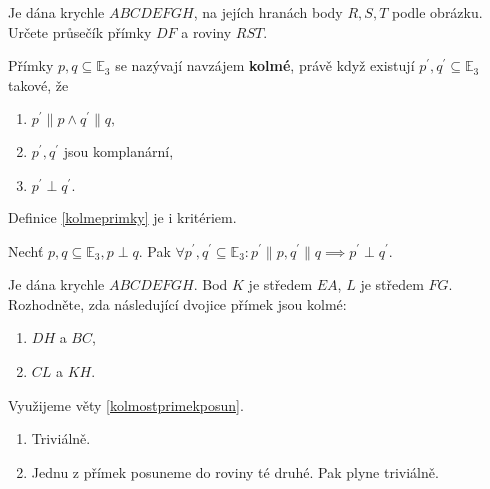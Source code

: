 \begin{priklad}
Je dána krychle $ABCDEFGH$, na jejích hranách body $R,S,T$ podle obrázku. Určete
průsečík přímky $DF$ a roviny $RST$.

\begin{figure}[ht!]
  \centering
\end{figure}
\end{priklad}

\begin{definition}\label{kolmeprimky}
    Přímky $p,q \subseteq \mathbb E_3$ se nazývají navzájem \textbf{kolmé}, právě když
    existují $p^\prime, q^\prime \subseteq \mathbb E_3$ takové, že
    \begin{enumerate}[$i.$]
    \item   $p^\prime \parallel p \land q^\prime \parallel q,$
   	\item $p^\prime, q^\prime$ jsou komplanární,
   	\item $p^\prime \perp q^\prime.$
    \end{enumerate}
\end{definition}

\begin{pozn}
    Definice \ref{kolmeprimky} je i kritériem.
\end{pozn}

\begin{veta}\label{kolmostprimekposun}
    Nechť $p,q \subseteq \mathbb E_3, p\perp q.$ Pak $\forall p^\prime, q^\prime
    \subseteq \mathbb E_3: p^\prime \parallel p, q^\prime \parallel q \implies
    p^\prime \perp q^\prime.$
\end{veta}

\begin{priklad}
Je dána krychle $ABCDEFGH$. Bod $K$ je středem $EA$, $L$ je středem $FG$. Rozhodněte,
zda následující dvojice přímek jsou kolmé:
\begin{enumerate}[$a.$]
\item $DH$ a $BC$,
\item $CL$ a $KH$.
\end{enumerate}
\end{priklad}

\begin{reseni}
Využijeme věty \ref{kolmostprimekposun}.
\begin{enumerate}[$a.$]
\item Triviálně.
\item Jednu z přímek posuneme do roviny té druhé. Pak plyne triviálně.
\end{enumerate}
\end{reseni}

